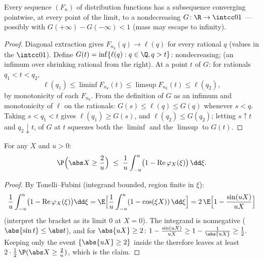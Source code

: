 \begin{theorem}
\label{thm:b3:clt:helly}
Every sequence $(F_n)$ of distribution functions has a
subsequence converging pointwise, at every  point
of the limit, to a nondecreasing  $G \colon
\R \to \intcc01$ --- possibly with $G(+\infty) - G(-\infty) <
1$ (mass may escape to infinity).
\end{theorem}

\begin{proof}
Diagonal extraction gives $F_{n_k}(q) \to \ell(q)$ for every
rational $q$ (values in the  $\intcc01$). Define
$G(t) = \inf\{\ell(q) : q \in \Q, q > t\}$: nondecreasing;
 (an infimum over shrinking rational
 from the right). At a  point $t$ of
$G$: for rationals $q_1 < t < q_2$,
\[
\ell(q_1) \leq \liminf F_{n_k}(t) \leq \limsup F_{n_k}(t)
\leq \ell(q_2),
\]
by monotonicity of each $F_{n_k}$. From the definition of
$G$ as an infimum and monotonicity of $\ell$ on the
rationals: $G(s) \leq \ell(q) \leq G(q)$ whenever $s < q$.
Taking $s < q_1 < t$ gives $\ell(q_1) \geq G(s)$, and
$\ell(q_2) \leq G(q_2)$; letting $s \uparrow t$ and $q_2
\downarrow t$,  of $G$ at $t$ squeezes both the
$\liminf$ and the $\limsup$ to $G(t)$.
\end{proof}

\begin{lemma}
\label{lem:b3:clt:tightness}
For any  $X$ and $u > 0$:
\[
\P\Bigl(\abs X \geq \frac2u\Bigr) \;\leq\;
\frac1u\int_{-u}^{u}\bigl(1 -
\operatorname{Re}\varphi_X(\xi)\bigr)\,\dd\xi .
\]
\end{lemma}

\begin{proof}
By Tonelli--Fubini (integrand bounded, region finite in
$\xi$):
\[
\frac1u\int_{-u}^u\bigl(1 -
\operatorname{Re}\varphi_X(\xi)\bigr)\dd\xi
= \E\Bigl[\frac1u\int_{-u}^u(1 - \cos(\xi X))\,\dd\xi\Bigr]
= 2\,\E\Bigl[1 - \frac{\sin(uX)}{uX}\Bigr]
\]
(interpret the bracket as its limit $0$ at $X = 0$). The
integrand is nonnegative ($\abs{\sin t} \leq \abs t$), and
for $\abs{uX} \geq 2$: $1 - \frac{\sin(uX)}{uX} \geq 1 -
\frac1{\abs{uX}} \geq \frac12$. Keeping only the event
$\{\abs{uX} \geq 2\}$ inside the  therefore
leaves at least $2 \cdot \frac12\,\P(\abs X \geq \frac2u)$,
which is the claim.
\end{proof}


